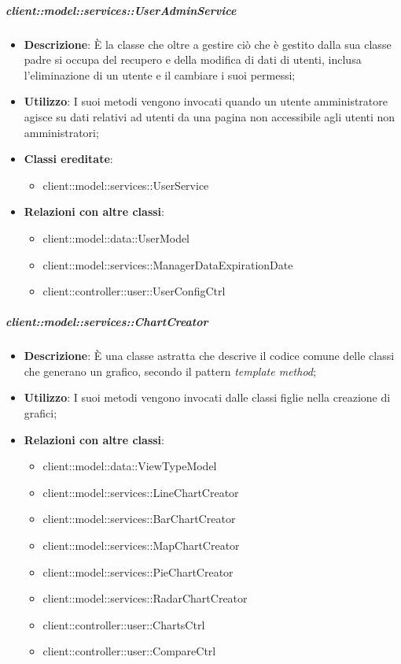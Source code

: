 		\subparagraph{client::model::services::UserAdminService} %
		\label{subp:client_model_services_useradminservice}
			\begin{itemize}
				\item \textbf{Descrizione}: È la classe che oltre a gestire ciò che è gestito dalla sua classe padre si occupa del recupero e della modifica di dati di utenti, inclusa l'eliminazione di un utente e il cambiare i suoi permessi;
				\item \textbf{Utilizzo}: I suoi metodi vengono invocati quando un utente amministratore agisce su dati relativi ad utenti da una pagina non accessibile agli utenti non amministratori;
				\item \textbf{Classi ereditate}:
					\begin{itemize}
						\item client::model::services::UserService
					\end{itemize}
				\item \textbf{Relazioni con altre classi}:
					\begin{itemize}
						\item client::model::data::UserModel
						\item client::model::services::ManagerDataExpirationDate
						\item client::controller::user::UserConfigCtrl
					\end{itemize}
				\end{itemize}

		\subparagraph{client::model::services::ChartCreator} %
		\label{subp:chartcreator}
			\begin{itemize}
				\item \textbf{Descrizione}: È una classe astratta che descrive il codice comune delle classi che generano un grafico, secondo il pattern \emph{template method};
				\item \textbf{Utilizzo}: I suoi metodi vengono invocati dalle classi figlie nella creazione di grafici;
				\item \textbf{Relazioni con altre classi}:
					\begin{itemize}
						\item client::model::data::ViewTypeModel
						\item client::model::services::LineChartCreator
						\item client::model::services::BarChartCreator
						\item client::model::services::MapChartCreator
						\item client::model::services::PieChartCreator
						\item client::model::services::RadarChartCreator
						\item client::controller::user::ChartsCtrl
						\item client::controller::user::CompareCtrl
					\end{itemize}
			\end{itemize}

